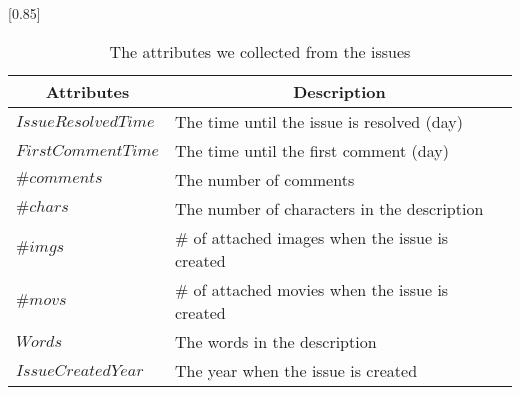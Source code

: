 
\begin{table}[t]
    \begin{center}
    \caption{The attributes we collected from the issues}
    \scalebox{0.85}[0.85]{
    \begin{tabular}{ll} 
        \toprule
        \multicolumn{1}{c}{\textbf{Attributes}} & \multicolumn{1}{c}{\textbf{Description}} \\ 
        \midrule
        $IssueResolvedTime$ & The time until the issue is resolved (day) \\
        $FirstCommentTime$ & The time until the first comment (day) \\
        $\#comments$ & The number of comments \\
        $\#chars$ & The number of characters in the description \\
        $\#imgs$ & \# of attached images when the issue is created \\
        $\#movs$ & \# of attached movies when the issue is created \\
        $Words$ &  The words in the description \\
        $IssueCreatedYear$ & The year when the issue is created \\
        \bottomrule
    \end{tabular}
    }
    \label{tab:issue-attr}
    \end{center}
\end{table}
